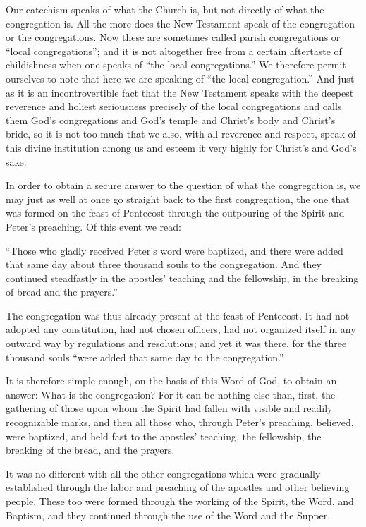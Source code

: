 Our catechism speaks of what the Church is, but not directly of what the congregation is. All the more does the New Testament speak of the congregation or the congregations. Now these are sometimes called parish congregations or “local congregations”; and it is not altogether free from a certain aftertaste of childishness when one speaks of “the local congregations.” We therefore permit ourselves to note that here we are speaking of “the local congregation.” And just as it is an incontrovertible fact that the New Testament speaks with the deepest reverence and holiest seriousness precisely of the local congregations and calls them God’s congregations and God’s temple and Christ’s body and Christ’s bride, so it is not too much that we also, with all reverence and respect, speak of this divine institution among us and esteem it very highly for Christ’s and God’s sake.

In order to obtain a secure answer to the question of what the congregation is, we may just as well at once go straight back to the first congregation, the one that was formed on the feast of Pentecost through the outpouring of the Spirit and Peter’s preaching. Of this event we read:

“Those who gladly received Peter’s word were baptized, and there were added that same day about three thousand souls to the congregation. And they continued steadfastly in the apostles’ teaching and the fellowship, in the breaking of bread and the prayers.”


The congregation was thus already present at the feast of Pentecost. It had not adopted any constitution, had not chosen officers, had not organized itself in any outward way by regulations and resolutions; and yet it was there, for the three thousand souls “were added that same day to the congregation.”

It is therefore simple enough, on the basis of this Word of God, to obtain an answer: What is the congregation? For it can be nothing else than, first, the gathering of those upon whom the Spirit had fallen with visible and readily recognizable marks, and then all those who, through Peter’s preaching, believed, were baptized, and held fast to the apostles’ teaching, the fellowship, the breaking of the bread, and the prayers.

It was no different with all the other congregations which were gradually established through the labor and preaching of the apostles and other believing people. These too were formed through the working of the Spirit, the Word, and Baptism, and they continued through the use of the Word and the Supper.

